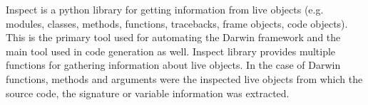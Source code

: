 Inspect is a python library for getting information from live objects (e.g. modules, classes, methods, functions, tracebacks, frame objects, code objects).
This is the primary tool used for automating the Darwin framework and the main tool used in code generation as well. Inspect library provides multiple
functions for gathering information about live objects. In the case of Darwin functions, methods and arguments were the inspected live objects from which the source
code, the signature or variable information was extracted.